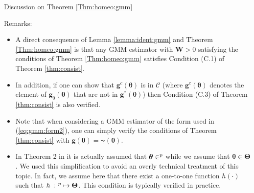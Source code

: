 \documentclass[envcountsect,usenames,dvipsnames]{beamer}
\def\btheta{\bm \theta}
\def\bgamma{\bm \gamma}
\def\g{\mathbf{g}}
\def\W{\mathbf{W}}
\theoremstyle{mystyle}
\begin{document}
\begin{frame}{Discussion on Theorem \ref{Thm:homeo:gmm}}

\begin{exampleblock}{Remarks:}
\begin{itemize}
\small
    \item A direct consequence of Lemma \ref{lemma:ident:gmm} and Theorem \ref{Thm:homeo:gmm} is that any GMM estimator with $\W > 0$ satisfying the conditions of Theorem \ref{Thm:homeo:gmm} satisfies Condition {\color{beamer@UIUCblue}(C.1)} of Theorem \ref{thm:consist}.
    \item In addition, if one can show that $\g^c(\btheta)$ is in $\mathcal{C}$ (where $\g^c(\btheta)$ denotes the element of $\g_0(\btheta)$ that are not in $\g^*(\btheta)$) then Condition {\color{beamer@UIUCblue}(C.3)} of Theorem \ref{thm:consist} is also verified.
    \item Note that when considering a GMM estimator of the form used in (\ref{eq:gmm:form2}), one can simply verify the conditions of Theorem \ref{thm:consist} with $\g(\btheta) = \bgamma (\btheta)$.
    \item In Theorem 2 in \cite{komunjer2012global} it is actually assumed that $\btheta \in \real^p$ while we assume that $\btheta \in \bm{\Theta}$. We used this simplification to avoid an overly technical treatment of this topic. In fact, we assume here that there exist a one-to-one function $h(\cdot)$ such that $h \, : \,\real^p  \mapsto \bm{\Theta}$. This condition is typically verified in practice.
\end{itemize} 
\end{exampleblock}

\end{frame}
\end{document}
